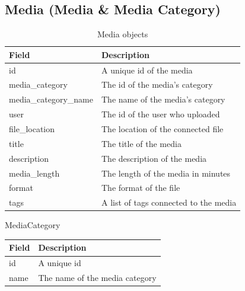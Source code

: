 \documentclass[11pt]{article}
\begin{document}
\newpage

\subsection{Media (Media \& Media Category)}

\begin{table}[H]
\caption{Media objects}
\begin{center}
\begin{tabular}{|l|l|}
\hline
 Field                                          &  Description                            \\
\hline
 id                                             &  A unique id of the media               \\
 media\_category                    &  The id of the media's category         \\
 media\_category\_name  &  The name of the media's category       \\
 user                                           &  The id of the user who uploaded        \\
 file\_location                     &  The location of the connected file     \\
 title                                          &  The title of the media                 \\
 description                                    &  The description of the media           \\
 media\_length                      &  The length of the media in minutes     \\
 format                                         &  The format of the file                 \\
 tags                                           &  A list of tags connected to the media  \\
\hline
\end{tabular}
\end{center}
\end{table}


MediaCategory

\begin{center}
\begin{tabular}{|l|l|}
\hline
 Field  &  Description                     \\
\hline
 id     &  A unique id                     \\
 name   &  The name of the media category  \\
\hline
\end{tabular}
\end{center}
\end{document}
